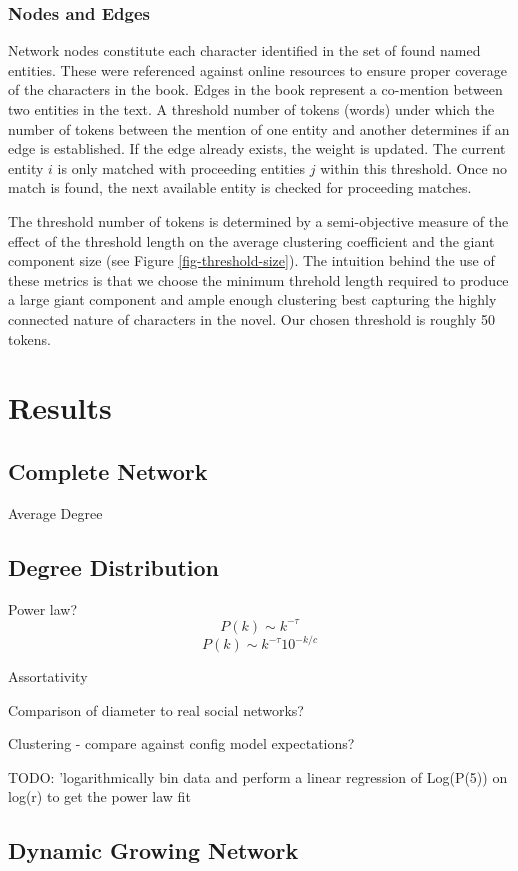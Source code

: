 \documentclass[12pt]{article}
\begin{document}
\subsubsection*{Nodes and Edges}
Network nodes constitute each character identified in the set of found named entities. These were referenced against online resources to ensure proper coverage of the characters in the book. Edges in the book represent a co-mention between two entities in the text. A threshold number of tokens (words) under which the number of tokens between the mention of one entity and another determines if an edge is established. If the edge already exists, the weight is updated. The current entity $i$ is only matched with proceeding entities $j$ within this threshold. Once no match is found, the next available entity is checked for proceeding matches.

The threshold number of tokens is determined by a semi-objective measure of the effect of the threshold length on the average clustering coefficient and the giant component size (see Figure \ref{fig-threshold-size}). The intuition behind the use of these metrics is that we choose the minimum threhold length required to produce a large giant component and ample enough clustering best capturing the highly connected nature of characters in the novel.  Our chosen threshold is roughly 50 tokens.

\section{Results}
\subsection{Complete Network}
Average Degree

\subsection{Degree Distribution}
Power law? 
$$P(k) \sim k^{-\tau}$$
$$P(k) \sim k^{-\tau}10^{-k/c}$$

Assortativity

Comparison of diameter to real social networks?

Clustering
 - compare against config model expectations?

TODO: 'logarithmically bin data and perform a linear regression of Log(P(5)) on log(r) to get the power law fit

\subsection{Dynamic Growing Network}
\end{document}
